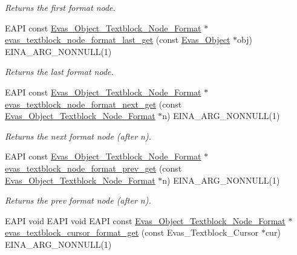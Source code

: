\begin{DoxyCompactItemize}
\begin{DoxyCompactList}\small\item\em Returns the first format node. \item\end{DoxyCompactList}\item 
EAPI const \hyperlink{Evas_8h_adcd2409468741c89d607f06e17da1f64}{Evas\_\-Object\_\-Textblock\_\-Node\_\-Format} $\ast$ \hyperlink{group__Evas__Object__Textblock_ga091521044b95190c75c57ca1661bcc83}{evas\_\-textblock\_\-node\_\-format\_\-last\_\-get} (const \hyperlink{group__Evas__Object__Group_ga9e19e6dd1f517a0ba437c0114d3e7c97}{Evas\_\-Object} $\ast$obj) EINA\_\-ARG\_\-NONNULL(1)
\begin{DoxyCompactList}\small\item\em Returns the last format node. \item\end{DoxyCompactList}\item 
EAPI const \hyperlink{Evas_8h_adcd2409468741c89d607f06e17da1f64}{Evas\_\-Object\_\-Textblock\_\-Node\_\-Format} $\ast$ \hyperlink{group__Evas__Object__Textblock_ga341e85b5bb0c9b2c82db4eb5a2432a9d}{evas\_\-textblock\_\-node\_\-format\_\-next\_\-get} (const \hyperlink{Evas_8h_adcd2409468741c89d607f06e17da1f64}{Evas\_\-Object\_\-Textblock\_\-Node\_\-Format} $\ast$n) EINA\_\-ARG\_\-NONNULL(1)
\begin{DoxyCompactList}\small\item\em Returns the next format node (after n). \item\end{DoxyCompactList}\item 
EAPI const \hyperlink{Evas_8h_adcd2409468741c89d607f06e17da1f64}{Evas\_\-Object\_\-Textblock\_\-Node\_\-Format} $\ast$ \hyperlink{group__Evas__Object__Textblock_ga8566bfff8ca71cc89cf704c9a082780c}{evas\_\-textblock\_\-node\_\-format\_\-prev\_\-get} (const \hyperlink{Evas_8h_adcd2409468741c89d607f06e17da1f64}{Evas\_\-Object\_\-Textblock\_\-Node\_\-Format} $\ast$n) EINA\_\-ARG\_\-NONNULL(1)
\begin{DoxyCompactList}\small\item\em Returns the prev format node (after n). \item\end{DoxyCompactList}\item 
EAPI void EAPI void EAPI const \hyperlink{Evas_8h_adcd2409468741c89d607f06e17da1f64}{Evas\_\-Object\_\-Textblock\_\-Node\_\-Format} $\ast$ \hyperlink{group__Evas__Object__Textblock_gad4abd947509949e9b683003018481aa3}{evas\_\-textblock\_\-cursor\_\-format\_\-get} (const Evas\_\-Textblock\_\-Cursor $\ast$cur) EINA\_\-ARG\_\-NONNULL(1)

\end{DoxyCompactItemize}

